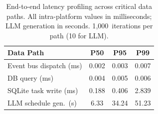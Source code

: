 \begin{table}[t]
  \centering
  \caption{End-to-end latency profiling across critical data paths.
  All intra-platform values in milliseconds; LLM generation in seconds.
  1{,}000~iterations per path (10 for LLM).}
  \label{tab:latency}
  \small
  \begin{tabular}{l S[table-format=4.3] S[table-format=5.3] S[table-format=5.3]}
    \toprule
    {Data Path} & {P50} & {P95} & {P99} \\
    \midrule
    Event bus dispatch (ms)     & 0.002  & 0.003   & 0.007   \\
    DB query (ms)               & 0.004  & 0.005   & 0.006   \\
    SQLite task write (ms)      & 0.188  & 0.406   & 2.839   \\
    LLM schedule gen.\ (s)     & 6.33   & 34.24   & 51.23   \\
    \bottomrule
  \end{tabular}
\end{table}
